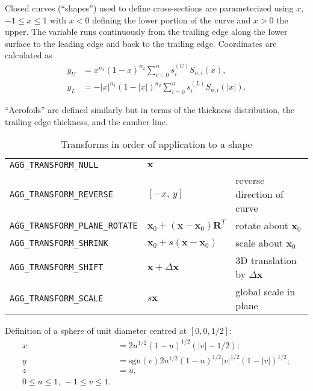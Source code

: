 \documentclass[a4paper,12pt]{article}
\newcommand{\sgn}{\mathrm{sgn}}
\begin{document}
Closed curves (``shapes'') used to define cross-sections are
parameterized using $x$, $-1\leq x \leq 1$ with $x<0$ defining the
lower portion of the curve and $x>0$ the upper. The variable runs
continuously from the trailing edge along the lower surface to the
leading edge and back to the trailing edge. Coordinates are calculated
as
\begin{align}
  \label{equ:curves}
  y_{U} &= x^{n_{1}}(1-x)^{n_{2}}\sum_{i=0}^{n} s_{i}^{(U)}S_{n,i}(x),\\
  y_{L} &= -|x|^{n_{1}}(1-|x|)^{n_{2}}\sum_{i=0}^{n} s_{i}^{(L)}S_{n,i}(|x|).
\end{align}

``Aerofoils'' are defined similarly but in terms of the thickness
distribution, the trailing edge thickness, and the camber line. 

\begin{table}
  \centering
  \begin{tabular}{lll}
    \verb+AGG_TRANSFORM_NULL+  & $\mathbf{x}$& \\
    \verb+AGG_TRANSFORM_REVERSE+  & $[-x,\, y]$ & reverse direction of curve\\
    \verb+AGG_TRANSFORM_PLANE_ROTATE+  &
    $
    \displaystyle
    \mathbf{x}_{0} +
    (\mathbf{x}-\mathbf{x}_{0})\mathbf{R}^{T}
    $
    &
    rotate about $\mathbf{x}_{0}$\\
    \verb+AGG_TRANSFORM_SHRINK+  &
    $\displaystyle\mathbf{x}_{0} + s(\mathbf{x}-\mathbf{x}_{0})$
    & scale about $\mathbf{x}_{0}$\\
    \verb+AGG_TRANSFORM_SHIFT+  & $\mathbf{x} + \Delta\mathbf{x}$&
    3D translation by $\Delta \mathbf{x}$\\
    \verb+AGG_TRANSFORM_SCALE+  & $s\textbf{x}$& global scale in plane
    \\
  \end{tabular}
  \caption{Transforms in order of application to a shape}
  \label{tab:transforms}
\end{table}

Definition of a sphere of unit diameter centred at $[0,0,1/2]$:
\begin{subequations}
  \label{equ:sphere}
  \begin{align}
    x &= 2u^{1/2}(1-u)^{1/2}(|v|-1/2);\\
    y &= \sgn(v)2u^{1/2}(1-u)^{1/2}|v|^{1/2}(1-|v|)^{1/2};\\
    z &= u,\\
    0\leq u\leq 1,\,-1\leq v\leq 1.\nonumber
  \end{align}
\end{subequations}
\end{document}
